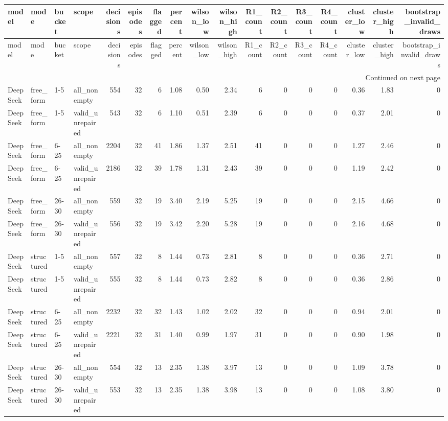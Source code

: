 \begin{longtable}{llllrrrrrrrrrrrrr}
\toprule
model & mode & bucket & scope & decisions & episodes & flagged & percent & wilson\_low & wilson\_high & R1\_count & R2\_count & R3\_count & R4\_count & cluster\_low & cluster\_high & bootstrap\_invalid\_draws \\
\midrule
\endfirsthead
\toprule
model & mode & bucket & scope & decisions & episodes & flagged & percent & wilson\_low & wilson\_high & R1\_count & R2\_count & R3\_count & R4\_count & cluster\_low & cluster\_high & bootstrap\_invalid\_draws \\
\midrule
\endhead
\midrule
\multicolumn{17}{r}{Continued on next page} \\
\midrule
\endfoot
\bottomrule
\endlastfoot
DeepSeek & free\_form & 1-5 & all\_nonempty & 554 & 32 & 6 & 1.08 & 0.50 & 2.34 & 6 & 0 & 0 & 0 & 0.36 & 1.83 & 0 \\
DeepSeek & free\_form & 1-5 & valid\_unrepaired & 543 & 32 & 6 & 1.10 & 0.51 & 2.39 & 6 & 0 & 0 & 0 & 0.37 & 2.01 & 0 \\
DeepSeek & free\_form & 6-25 & all\_nonempty & 2204 & 32 & 41 & 1.86 & 1.37 & 2.51 & 41 & 0 & 0 & 0 & 1.27 & 2.46 & 0 \\
DeepSeek & free\_form & 6-25 & valid\_unrepaired & 2186 & 32 & 39 & 1.78 & 1.31 & 2.43 & 39 & 0 & 0 & 0 & 1.19 & 2.42 & 0 \\
DeepSeek & free\_form & 26-30 & all\_nonempty & 559 & 32 & 19 & 3.40 & 2.19 & 5.25 & 19 & 0 & 0 & 0 & 2.15 & 4.66 & 0 \\
DeepSeek & free\_form & 26-30 & valid\_unrepaired & 556 & 32 & 19 & 3.42 & 2.20 & 5.28 & 19 & 0 & 0 & 0 & 2.16 & 4.68 & 0 \\
DeepSeek & structured & 1-5 & all\_nonempty & 557 & 32 & 8 & 1.44 & 0.73 & 2.81 & 8 & 0 & 0 & 0 & 0.36 & 2.71 & 0 \\
DeepSeek & structured & 1-5 & valid\_unrepaired & 555 & 32 & 8 & 1.44 & 0.73 & 2.82 & 8 & 0 & 0 & 0 & 0.36 & 2.86 & 0 \\
DeepSeek & structured & 6-25 & all\_nonempty & 2232 & 32 & 32 & 1.43 & 1.02 & 2.02 & 32 & 0 & 0 & 0 & 0.94 & 2.01 & 0 \\
DeepSeek & structured & 6-25 & valid\_unrepaired & 2221 & 32 & 31 & 1.40 & 0.99 & 1.97 & 31 & 0 & 0 & 0 & 0.90 & 1.98 & 0 \\
DeepSeek & structured & 26-30 & all\_nonempty & 554 & 32 & 13 & 2.35 & 1.38 & 3.97 & 13 & 0 & 0 & 0 & 1.09 & 3.78 & 0 \\
DeepSeek & structured & 26-30 & valid\_unrepaired & 553 & 32 & 13 & 2.35 & 1.38 & 3.98 & 13 & 0 & 0 & 0 & 1.08 & 3.80 & 0 \\

\end{longtable}
